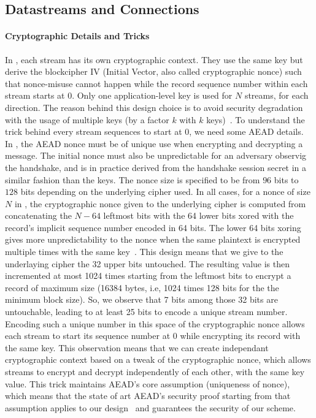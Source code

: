 \subsection{Datastreams and \tcp Connections}
\label{sec:datastreams}

\paragraph*{Cryptographic Details and Tricks}
In \tcpls, each stream has its own cryptographic context. They use the same key
but derive the blockcipher IV (Initial Vector, also called cryptographic nonce)
such that nonce-misuse cannot happen while the record sequence number within
each stream starts at 0. Only one application-level key is used for $N$ streams,
for each direction.  The reason behind this design choice is to avoid security
degradation with the usage of multiple keys (by a factor $k$ with $k$
keys)~\cite{chatterjee2011another}. To understand the trick behind every
stream sequences to start at 0, we need some AEAD details. In \tcpls, the AEAD
nonce must be of unique use when encrypting and decrypting a message. The
initial nonce must also be unpredictable for an adversary observig the
handshake, and is in practice derived from the \tls handshake session secret in a similar fashion than the \tls keys. The nonce size is specified to be from $96$ bits to $128$ bits depending on the underlying cipher used. In all cases, for a nonce of size $N$ in \tls, the cryptographic nonce given to the underlying cipher is computed from concatenating the $N-64$ leftmost bits with the 64 lower bits xored with the record's implicit sequence number encoded in 64 bits. The lower 64 bits xoring gives more unpredictability to the nonce when the same plaintext is encrypted multiple times with the same key~\cite{bellare2016multi,hoang2018multi}. This design means that we give to the underlaying cipher the 32 upper bits untouched. The resulting value is then incremented at most 1024 times starting from the leftmost bits to encrypt a \tls record of maximum size (16384 bytes, i.e, 1024 times 128 bits for the the minimum block size). So, we observe that 7 bits among those 32 bits are untouchable, leading to at least 25 bits to encode a unique stream number. Encoding such a unique number in this space of the cryptographic nonce allows each stream to start its sequence number at 0 while encrypting its record with the same key. This observation means that we can create independant cryptographic context based on a tweak of the cryptographic nonce, which allows streams to encrypt and decrypt independently of each other, with the same key value. This trick maintains AEAD's core assumption (uniqueness of nonce), which means that the state of art AEAD's security proof starting from that assumption applies to our design~\cite{chatterjee2011another} and guarantees the security of our scheme.

